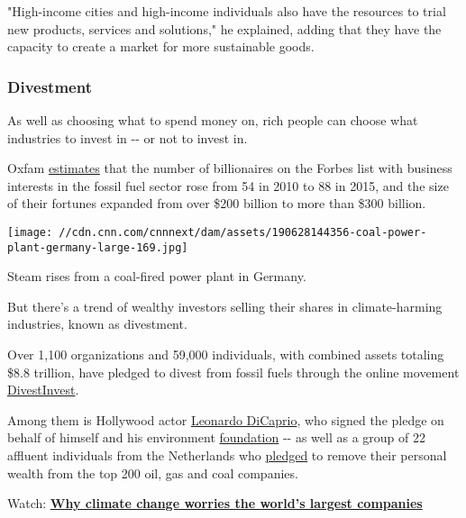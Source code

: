 "High-income cities and high-income individuals also have the resources
to trial new products, services and solutions," he explained, adding
that they have the capacity to create a market for more sustainable
goods.

\hypertarget{divestment}{%
\subsubsection{Divestment}\label{divestment}}

As well as choosing what to spend money on, rich people can choose what
industries to invest in -\/- or not to invest in.

Oxfam
\href{https://www-cdn.oxfam.org/s3fs-public/file_attachments/mb-extreme-carbon-inequality-021215-en.pdf}{estimates}
that the number of billionaires on the Forbes list with business
interests in the fossil fuel sector rose from 54 in 2010 to 88 in 2015,
and the size of their fortunes expanded from over \$200 billion to more
than \$300 billion.

\texttt{[image: //cdn.cnn.com/cnnnext/dam/assets/190628144356-coal-power-plant-germany-large-169.jpg]}

Steam rises from a coal-fired power plant in Germany.

But there's a trend of wealthy investors selling their shares in
climate-harming industries, known as divestment.

Over 1,100 organizations and 59,000 individuals, with combined assets
totaling \$8.8 trillion, have pledged to divest from fossil fuels
through the online movement
\href{https://www.divestinvest.org/}{DivestInvest}.

Among them is Hollywood actor
\href{https://www.leonardodicaprio.org/leonardo-and-ldf-join-more-than-400-institutions-pledging-to-divest-from-fossil-fuels/}{Leonardo
DiCaprio}, who signed the pledge on behalf of himself and his
environment \href{https://www.leonardodicaprio.org/}{foundation} -\/- as
well as a group of 22 affluent individuals from the Netherlands who
\href{https://gofossilfree.org/nl/press-release/affluent-dutch-individuals-divest-200-million-in-personal-wealth-from-the-fossil-fuel-industry/}{pledged}
to remove their personal wealth from the top 200 oil, gas and coal
companies.

Watch:
\href{https://edition.cnn.com/videos/business/2019/01/23/climate-change-effects-companies-cdp-orig-js.cnn/video/playlists/climate-change/}{\textbf{Why
climate change worries the world's largest companies}}

